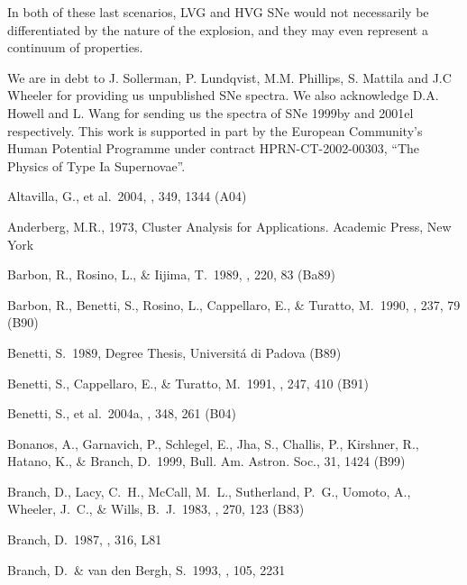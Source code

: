 \documentclass[preprint2]{aastex}
\begin{document}
In both of these last scenarios, LVG and HVG SNe would not necessarily be
differentiated by the nature of the explosion, and they may even represent a
continuum of properties.


\acknowledgments 
%
We are in debt to J. Sollerman, P. Lundqvist, M.M. Phillips, S. Mattila and J.C Wheeler for
providing us unpublished SNe spectra. We also acknowledge D.A. Howell
and L. Wang for sending us the spectra of SNe 1999by and 2001el
respectively. This work is supported in part by the European
Community's Human Potential Programme under contract
HPRN-CT-2002-00303, ``The Physics of Type Ia Supernovae''.


\begin{thebibliography}{}

 Altavilla, G., et al.\
2004, \mnras, 349, 1344 (A04)

 Anderberg, M.R., 1973, Cluster
Analysis for Applications. Academic Press, New York

 Barbon, R., Rosino,
L., \& Iijima, T.\ 1989, \aap, 220, 83 (Ba89)

 Barbon, R., Benetti, S., 
Rosino, L., Cappellaro, E., \& Turatto, M.\ 1990, \aap, 237, 79 (B90)

Benetti, S.\ 1989, Degree Thesis, Universit\'a di Padova (B89)

Benetti, S., Cappellaro, E., \& Turatto, M.\ 1991, \aap, 247, 410 (B91)

 Benetti, S., et al.\ 
2004a, \mnras, 348, 261 (B04)


 Bonanos, A., Garnavich, 
P., Schlegel, E., Jha, S., Challis, P., Kirshner, R., Hatano, K., \& 
Branch, D.\ 1999, Bull. Am. Astron. Soc., 31, 1424 (B99)

 Branch, D., Lacy, C.~H., 
McCall, M.~L., Sutherland, P.~G., Uomoto, A., Wheeler, J.~C., \& Wills, 
B.~J.\ 1983, \apj, 270, 123 (B83)

 Branch, D.\ 1987, \apjl, 316, 
L81 

 Branch, D.~\& van den
Bergh, S.\ 1993, \aj, 105, 2231


\end{thebibliography}
\end{document}
